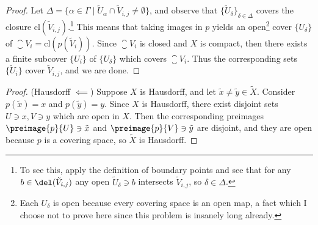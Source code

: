 \documentclass[12pt,letterpaper]{article}
\begin{document}
\begin{enumerate}
\begin{proof}
Let $\Delta=\{\alpha\in \Gamma \mid \tilde{U}_\alpha\cap\tilde{V}_{i,j}\neq\emptyset\}$, and observe that $\{\tilde{U}_{\delta}\}_{\delta\in\Delta}$ covers the closure $\text{cl}(\tilde{V}_{i,j})$.\footnote{To see this, apply the definition of boundary points and see that for any $b\in\del(\tilde{V}_{i,j})$ any open $\tilde{U}_{\delta}\ni b$ intersects $\tilde{V}_{i,j}$, so $\delta\in \Delta$.} This means that taking images in $p$ yields an open\footnote{Each $U_\delta$ is open because every covering space is an open map, a fact which I choose not to prove here since this problem is insanely long already.} cover $\{U_\delta\}$ of $\closure{V_i}=\text{cl}(p(\tilde{V}_i))$. 
%
Since $\closure{V_i}$ is closed and $X$ is compact, then there exists a finite subcover $\{U_i\}$ of $\{U_\delta\}$ which covers $\closure{V_i}$. Thus the corresponding sets $\{\tilde U_i\}$ cover $\tilde{V}_{i,j}$, and we are done. \qedwhitehere
\end{proof}

\begin{proof}(Hausdorff $\impliedby$) Suppose $X$ is Hausdorff, and let $\tilde{x}\neq \tilde{y} \in \tilde{X}$. Consider $p(\tilde{x})=x$ and $p(\tilde{y})=y$. Since $X$ is Hausdorff, there exist disjoint sets $U\ni x, V\ni y$ which are open in $X$. Then the corresponding preimages $\preimage{p}{U}\ni\tilde{x}$ and $\preimage{p}{V}\ni \tilde{y}$ are disjoint, and they are open because $p$ is a covering space, so $\tilde{X}$ is Hausdorff. \qedwhitehere
\end{proof}

%


\end{enumerate}
\end{document}
